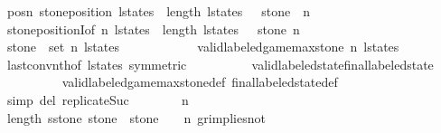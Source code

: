 \begin{isabellebody}
\ posn{\isacharcolon}\ {\isachardoublequoteopen}stone{\isacharunderscore}position\ {\isacharparenleft}l{\isacharunderscore}states\ {\isacharbang}\ {\isacharparenleft}length\ l{\isacharunderscore}states\ {\isacharminus}\ {}{\isacharparenright}{\isacharparenright}\ stone\ {\isacharequal}\ n{\isachardoublequoteclose}\isanewline
\ \ \ \ \ \ \ \ \isamarkupfalse%
\ stone{\isacharunderscore}positionI{\isacharbrackleft}of\ n\ {\isachardoublequoteopen}l{\isacharunderscore}states\ {\isacharbang}\ {\isacharparenleft}length\ l{\isacharunderscore}states\ {\isacharminus}\ {}{\isacharparenright}{\isachardoublequoteclose}\ stone\ n{\isacharbrackright}\isanewline
\ \ \ \ \ \ \ \ \isamarkupfalse%
\ {\isacharbackquoteopen}stone\ {\isasymin}\ set\ {\isacharbrackleft}{}{\isachardot}{\isachardot}{\isacharless}n{\isacharbrackright}{\isacharbackquoteclose}\ {\isacharbackquoteopen}l{\isacharunderscore}states\ {\isasymnoteq}\ {\isacharbrackleft}{\isacharbrackright}{\isacharbackquoteclose}\isanewline
\ \ \ \ \ \ \ \ \isamarkupfalse%
\ {\isacharbackquoteopen}valid{\isacharunderscore}labeled{\isacharunderscore}game{\isacharunderscore}max{\isacharunderscore}stone\ n\ l{\isacharunderscore}states{\isacharbackquoteclose}\isanewline
\ \ \ \ \ \ \ \ \isamarkupfalse%
\ last{\isacharunderscore}conv{\isacharunderscore}nth{\isacharbrackleft}of\ l{\isacharunderscore}states{\isacharcomma}\ symmetric{\isacharbrackright}\isanewline
\ \ \ \ \ \ \ \ \isamarkupfalse%
\ valid{\isacharunderscore}labeled{\isacharunderscore}state{\isacharunderscore}final{\isacharunderscore}labeled{\isacharunderscore}state\isanewline
\ \ \ \ \ \ \ \ \isamarkupfalse%
\ valid{\isacharunderscore}labeled{\isacharunderscore}game{\isacharunderscore}max{\isacharunderscore}stone{\isacharunderscore}def\ final{\isacharunderscore}labeled{\isacharunderscore}state{\isacharunderscore}def\isanewline
\ \ \ \ \ \ \ \ \isamarkupfalse%
\ {\isacharparenleft}simp\ del{\isacharcolon}\ replicate{\isacharunderscore}Suc{\isacharparenright}\isanewline
\isanewline
\ \ \ \ \ \ \isamarkupfalse%
\ {\isachardoublequoteopen}n\ {\isachargreater}\ {}{\isachardoublequoteclose}\isanewline
\ \ \ \ \ \ \ \ \isamarkupfalse%
\ {\isacartoucheopen}length\ {\isacharparenleft}{\isacharquery}sstone\ stone{\isacharparenright}\ {\isacharasterisk}\ {\isacharparenleft}stone\ {\isacharplus}\ {}{\isacharparenright}\ {\isacharless}\ n{\isacartoucheclose}\ gr{\isacharunderscore}implies{\isacharunderscore}not{}\isanewline

\end{isabellebody}
